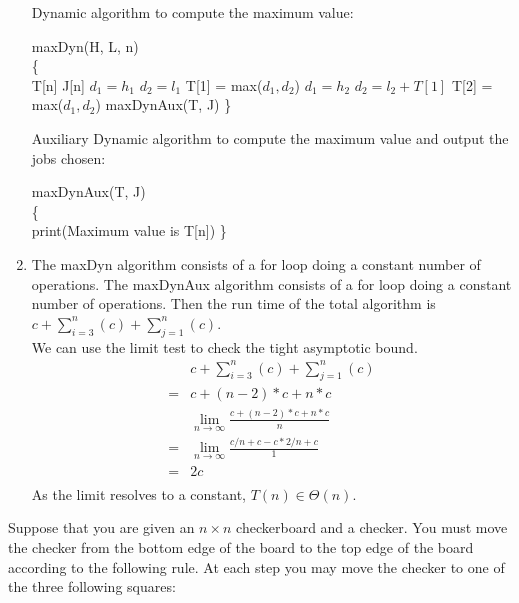 \documentclass{assignment}
\begin{document}
\begin{problemlist}
\begin{answer}
\begin{enumerate}
Dynamic algorithm to compute the maximum value:
\IncMargin{3em}
\begin{algorithm}
  maxDyn(H, L, n)\\\{\\
  \Indp
  T[n]\; J[n]\;
  $d_1 = h_1$\;
  $d_2 = l_1$\;
  T[1] = max($d_1, d_2$)\;
  $d_1 = h_2$\;
  $d_2 = l_2 + T[1]$\;
  T[2] = max($d_1, d_2$)\;
  maxDynAux(T, J)\;
  \Indm
  \}
\end{algorithm}
\DecMargin{3em}
\clearpage
Auxiliary Dynamic algorithm to compute the maximum value and output the jobs chosen:\\
\IncMargin{3em}
\begin{algorithm}
  maxDynAux(T, J)\\\{\\
  \Indp
  print(Maximum value is T[n])\;
  \Indm
  \}
\end{algorithm}
\DecMargin{3em}
\item
The maxDyn algorithm consists of a for loop doing a constant number of operations. The maxDynAux algorithm consists of a for loop doing a constant number of operations. Then the run time of the total algorithm is $c + \sum_{i=3}^n(c) + \sum_{j=1}^n(c)$.\\
We can use the limit test to check the tight asymptotic bound.
\begin{align*}
&c + \sum_{i=3}^n(c) + \sum_{j=1}^n(c)\\
=&c + (n-2)*c + n*c\\
&\lim_{n\rightarrow \infty} \frac{c + (n-2)*c + n*c}{n}\\
=&\lim_{n\rightarrow \infty} \frac{c/n + c-c*2/n + c}{1}\\
=&2c\\
\end{align*} 
As the limit resolves to a constant, $T(n) \in \Theta(n)$.
\end{enumerate}
\end{answer}
\clearpage
\pbitem
\begin{problem}
Suppose that you are given an $n\times n$ checkerboard and a checker. You must move the checker from the bottom edge of the board to the top edge of the board according to the following rule. At each step you may move the checker to one of the three following squares:

\end{problem}
\end{problemlist}
\end{document}
